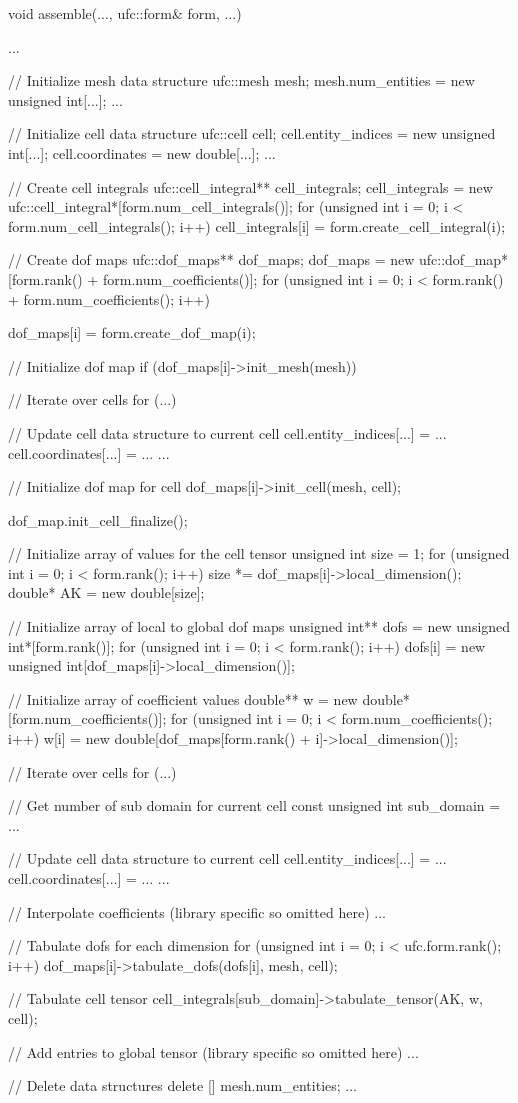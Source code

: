 \scriptsize
\begin{code}
void assemble(..., ufc::form& form, ...)
{
  ...

  // Initialize mesh data structure
  ufc::mesh mesh;
  mesh.num_entities = new unsigned int[...];
  ...

  // Initialize cell data structure
  ufc::cell cell;
  cell.entity_indices = new unsigned int[...];
  cell.coordinates = new double[...];
  ...

  // Create cell integrals
  ufc::cell_integral** cell_integrals;
  cell_integrals = new ufc::cell_integral*[form.num_cell_integrals()];
  for (unsigned int i = 0; i < form.num_cell_integrals(); i++)
    cell_integrals[i] = form.create_cell_integral(i);

  // Create dof maps
  ufc::dof_maps** dof_maps;
  dof_maps = new ufc::dof_map*[form.rank() + form.num_coefficients()];
  for (unsigned int i = 0; i < form.rank() + form.num_coefficients(); i++)
  {
    dof_maps[i] = form.create_dof_map(i);

    // Initialize dof map
    if (dof_maps[i]->init_mesh(mesh))
    { 
      // Iterate over cells
      for (...)
      {
        // Update cell data structure to current cell
        cell.entity_indices[...] = ...
        cell.coordinates[...] = ...
        ...
       
        // Initialize dof map for cell
        dof_maps[i]->init_cell(mesh, cell);        
      }

      dof_map.init_cell_finalize();
    }
  }

  // Initialize array of values for the cell tensor
  unsigned int size = 1;
  for (unsigned int i = 0; i < form.rank(); i++)
    size *= dof_maps[i]->local_dimension();
  double* AK = new double[size];

  // Initialize array of local to global dof maps
  unsigned int** dofs = new unsigned int*[form.rank()];
  for (unsigned int i = 0; i < form.rank(); i++)
    dofs[i] = new unsigned int[dof_maps[i]->local_dimension()];

  // Initialize array of coefficient values
  double** w = new double*[form.num_coefficients()];
  for (unsigned int i = 0; i < form.num_coefficients(); i++)
    w[i] = new double[dof_maps[form.rank() + i]->local_dimension()];

  // Iterate over cells
  for (...)
  {
    // Get number of sub domain for current cell
    const unsigned int sub_domain = ...

    // Update cell data structure to current cell
    cell.entity_indices[...] = ...
    cell.coordinates[...] = ...
    ...

    // Interpolate coefficients (library specific so omitted here)
    ...

    // Tabulate dofs for each dimension
    for (unsigned int i = 0; i < ufc.form.rank(); i++)
      dof_maps[i]->tabulate_dofs(dofs[i], mesh, cell);

    // Tabulate cell tensor
    cell_integrals[sub_domain]->tabulate_tensor(AK, w, cell);

    // Add entries to global tensor (library specific so omitted here)
    ...
  }

  // Delete data structures
  delete [] mesh.num_entities;
  ...
}
\end{code}
\normalsize
